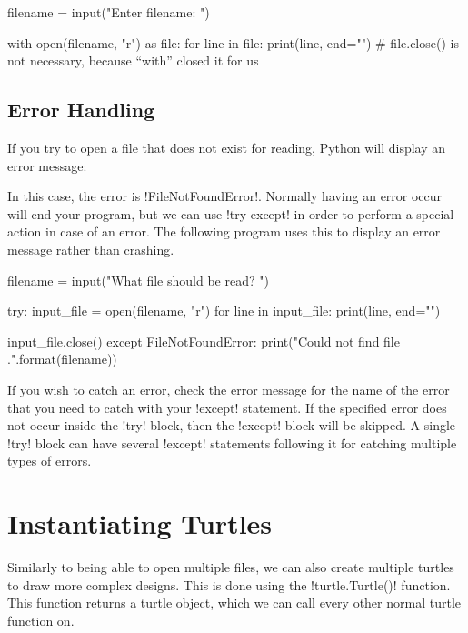 \documentclass[11pt]{cselabheader}
\begin{document}
\begin{python3code}
filename = input("Enter filename: ")

with open(filename, "r") as file:
  for line in file:
    print(line, end="")
# file.close() is not necessary, because ``with'' closed it for us
\end{python3code}


\subsection{Error Handling}
If you try to open a file that does not exist for reading, Python will display
an error message:


In this case, the error is \pythoninline!FileNotFoundError!. Normally having an
error occur will end your program, but we can use \pythoninline!try-except! in
order to perform a special action in case of an error. The following program
uses this to display an error message rather than crashing.

\begin{python3code}
filename = input("What file should be read? ")

try:
  input_file = open(filename, "r")
  for line in input_file:
    print(line, end="")

  input_file.close()
except FileNotFoundError:
  print("Could not find file {}.".format(filename))
\end{python3code}

If you wish to catch an error, check the error message for the name of the error
that you need to catch with your \pythoninline!except! statement. If the specified
error does not occur inside the \pythoninline!try! block, then the
\pythoninline!except! block will be skipped. A single \pythoninline!try! block can
have several \pythoninline!except! statements following it for catching multiple
types of errors.

\pagebreak
\section{Instantiating Turtles}
Similarly to being able to open multiple files, we can also create multiple
turtles to draw more complex designs. This is done using the
\pythoninline!turtle.Turtle()! function. This function returns a turtle object,
which we can call every other normal turtle function on.
\end{document}
